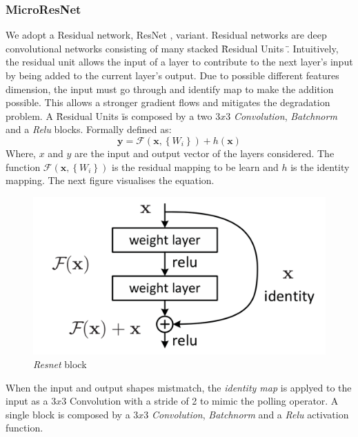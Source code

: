 \documentclass[../document.tex]{subfiles}
\begin{document}
\subsubsection{MicroResNet}
We adopt a Residual network, ResNet \cite{he2015deep}, variant. Residual networks are deep convolutional networks consisting of many stacked \" Residual Units \". Intuitively, the residual unit allows the input of a layer to contribute to the next layer's input by being added to the current layer's output. Due to possible different features dimension, the input must go through and identify map to make the addition possible. This allows a stronger gradient flows and mitigates the degradation problem. A \"Residual Units \" is composed by a two $3x3$ \emph{Convolution}, \emph{Batchnorm} \cite{ioffe2015batch} and a \emph{Relu} blocks. Formally defined as: 
\begin{equation}
    \mathbf{y}=\mathcal{F}\left(\mathbf{x},\left\{W_{i}\right\}\right)+h(\mathbf{x})
    \label{eq : resnet}
\end{equation}
Where, $x$ and $y$ are the input and output vector of the layers considered. The function $\mathcal{F}\left(\mathbf{x},\left\{W_{i}\right\}\right)$ is the residual mapping to be learn and $h$ is the identity mapping. The next figure visualises the equation.
\begin{figure}[H]
    \centering
    \includegraphics[scale=0.3]{../img/implementation/estimator/resnet_block.png}
    \caption{\emph{Resnet} block \cite{he2015deep}}
\end{figure}
When the input and output shapes mistmatch, the \emph{identity map} is applyed to the input as a $3x3$ Convolution with a stride of 2 to mimic the polling operator. A single block is composed by a $3x3$ \emph{Convolution}, \emph{Batchnorm} and a \emph{Relu} activation function. 
\end{document}
